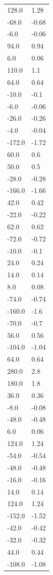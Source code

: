 \begin{longtable}{ll}
128.0 & 1.28 \\
-68.0 & -0.68 \\
-6.0 & -0.06 \\
94.0 & 0.94 \\
6.0 & 0.06 \\
110.0 & 1.1 \\
64.0 & 0.64 \\
-10.0 & -0.1 \\
-6.0 & -0.06 \\
-26.0 & -0.26 \\
-4.0 & -0.04 \\
-172.0 & -1.72 \\
60.0 & 0.6 \\
50.0 & 0.5 \\
-28.0 & -0.28 \\
-166.0 & -1.66 \\
42.0 & 0.42 \\
-22.0 & -0.22 \\
62.0 & 0.62 \\
-72.0 & -0.72 \\
-10.0 & -0.1 \\
24.0 & 0.24 \\
14.0 & 0.14 \\
8.0 & 0.08 \\
-74.0 & -0.74 \\
-160.0 & -1.6 \\
-70.0 & -0.7 \\
56.0 & 0.56 \\
-104.0 & -1.04 \\
64.0 & 0.64 \\
280.0 & 2.8 \\
180.0 & 1.8 \\
36.0 & 0.36 \\
-8.0 & -0.08 \\
-48.0 & -0.48 \\
6.0 & 0.06 \\
124.0 & 1.24 \\
-54.0 & -0.54 \\
-48.0 & -0.48 \\
-16.0 & -0.16 \\
14.0 & 0.14 \\
124.0 & 1.24 \\
-152.0 & -1.52 \\
-42.0 & -0.42 \\
-32.0 & -0.32 \\
44.0 & 0.44 \\
-108.0 & -1.08 \\

\end{longtable}
